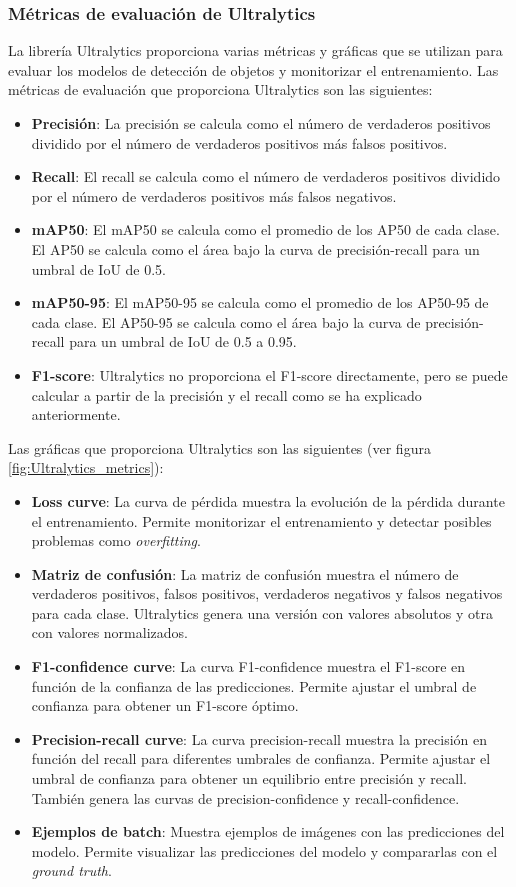 \subsubsection{Métricas de evaluación de Ultralytics\label{SEC:METRICAS_ULTRALYTICS}}
La librería Ultralytics proporciona varias métricas y gráficas que se utilizan para evaluar los modelos de detección de objetos y monitorizar el entrenamiento. Las métricas de evaluación que proporciona Ultralytics son las siguientes:
\begin{itemize}
    \item \textbf{Precisión}: La precisión se calcula como el número de verdaderos positivos dividido por el número de verdaderos positivos más falsos positivos.
    \item \textbf{Recall}: El recall se calcula como el número de verdaderos positivos dividido por el número de verdaderos positivos más falsos negativos.
    \item \textbf{mAP50}: El mAP50 se calcula como el promedio de los AP50 de cada clase. El AP50 se calcula como el área bajo la curva de precisión-recall para un umbral de IoU de 0.5.
    \item \textbf{mAP50-95}: El mAP50-95 se calcula como el promedio de los AP50-95 de cada clase. El AP50-95 se calcula como el área bajo la curva de precisión-recall para un umbral de IoU de 0.5 a 0.95.
    \item \textbf{F1-score}: Ultralytics no proporciona el F1-score directamente, pero se puede calcular a partir de la precisión y el recall como se ha explicado anteriormente.
\end{itemize}

Las gráficas que proporciona Ultralytics son las siguientes (ver figura \ref{fig:Ultralytics_metrics}):

\begin{itemize}
    \item \textbf{Loss curve}: La curva de pérdida muestra la evolución de la pérdida durante el entrenamiento. Permite monitorizar el entrenamiento y detectar posibles problemas como \textit{overfitting}.
    \item \textbf{Matriz de confusión}: La matriz de confusión muestra el número de verdaderos positivos, falsos positivos, verdaderos negativos y falsos negativos para cada clase. Ultralytics genera una versión con valores absolutos y otra con valores normalizados.
    \item \textbf{F1-confidence curve}: La curva F1-confidence muestra el F1-score en función de la confianza de las predicciones. Permite ajustar el umbral de confianza para obtener un F1-score óptimo.
    \item \textbf{Precision-recall curve}: La curva precision-recall muestra la precisión en función del recall para diferentes umbrales de confianza. Permite ajustar el umbral de confianza para obtener un equilibrio entre precisión y recall. También genera las curvas de precision-confidence y recall-confidence.
    \item \textbf{Ejemplos de batch}: Muestra ejemplos de imágenes con las predicciones del modelo. Permite visualizar las predicciones del modelo y compararlas con el \textit{ground truth}.
\end{itemize}

